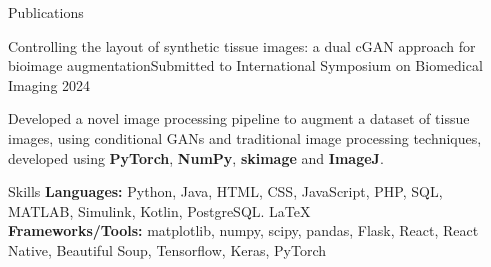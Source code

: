 \documentclass{resume}
\begin{document}
    \begin{rSection}{Publications}
        \begin{rSubsection}{Controlling the layout of synthetic tissue images: a dual cGAN approach for bioimage augmentation}{}{Submitted to International Symposium on Biomedical Imaging 2024}{}{}
            \item Developed a novel image processing pipeline to augment a dataset of tissue images, using conditional GANs and traditional image processing techniques, developed using \textbf{PyTorch}, \textbf{NumPy}, \textbf{skimage} and \textbf{ImageJ}.
        \end{rSubsection}
    \end{rSection}

    \begin{rSection}{Skills}
        \textbf{Languages:} Python, Java, HTML, CSS, JavaScript, PHP, SQL, MATLAB, Simulink, Kotlin, PostgreSQL. \LaTeX\\
        \textbf{Frameworks/Tools:} matplotlib, numpy, scipy, pandas, Flask, React, React Native, Beautiful Soup, Tensorflow, Keras, PyTorch \\ 
    \end{rSection}
    
        
\end{document}
